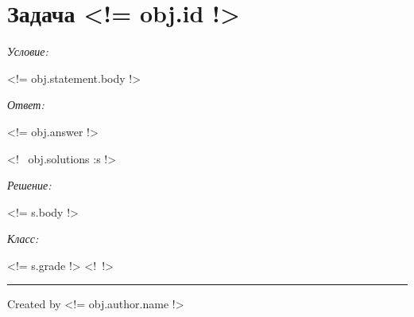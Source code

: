\documentclass{article}
\newcommand{\tmp}[1]{\noindent\par\textit{#1: }\nopagebreak\par}
\begin{document}
    \section{Задача \textnumero <!= obj.id !>}
    \tmp{Условие}
    <!= obj.statement.body !>
    \tmp{Ответ}
    <!= obj.answer !>

    <!~ obj.solutions :s !>
        \tmp{Решение}
        <!= s.body !>
        \tmp{Класс}
        <!= s.grade !>
    <!~!>

    \noindent\rule{\textwidth}{0.2pt}
    Created by <!= obj.author.name !>
\end{document}
